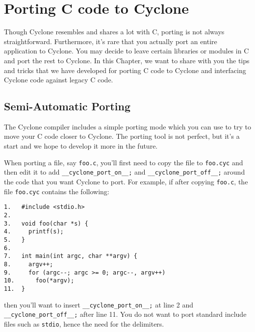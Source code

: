 \section{Porting C code to Cyclone}

\ifscreen
\newenvironment{porta}[2]{%
  \begin{list}{}{}%
  \item[\hypertarget{#1}{\colorbox{lightblue}{\textbf{#2}}}]}{\end{list}}
\else
\newenvironment{porta}[2]{%
  \begin{list}{}{}%
  \item[\hypertarget{#1}{\textbf{#2}}]}{\end{list}}
\fi
Though Cyclone resembles and shares a lot with C, porting is not
always straightforward.  Furthermore, it's rare that you actually port
an entire application to Cyclone.  You may decide to leave certain
libraries or modules in C and port the rest to Cyclone.  In this
Chapter, we want to share with you the tips and tricks that we have
developed for porting C code to Cyclone and interfacing Cyclone
code against legacy C code.

\subsection{Semi-Automatic Porting}

The Cyclone compiler includes a simple porting mode which you can
use to try to move your C code closer to Cyclone.  The porting
tool is not perfect, but it's a start and we hope to develop it
more in the future.  

When porting a file, say \texttt{foo.c}, you'll first need to
copy the file to \texttt{foo.cyc} and then edit it to
add \texttt{__cyclone_port_on__;} and 
\texttt{__cyclone_port_off__;} around the code that you want
Cyclone to port.  For example, if after copying \texttt{foo.c},
the file \texttt{foo.cyc} contains the
following:
\begin{verbatim}
1.   #include <stdio.h>
2. 
3.   void foo(char *s) {
4.     printf(s);
5.   }
6. 
7.   int main(int argc, char **argv) {
8.     argv++;
9.     for (argc--; argc >= 0; argc--, argv++)
10.      foo(*argv);
11.  }
\end{verbatim}
then you'll want to insert \texttt{__cyclone_port_on__;} at line
2 and \texttt{__cyclone_port_off__;} after line 11.  You do not
want to port standard include files such as \texttt{stdio}, hence
the need for the delimiters.

